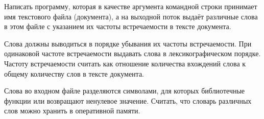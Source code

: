
Написать программу, которая в качестве аргумента командной строки
принимает имя текстового файла (документа), а на выходной поток выдаёт
различные слова в этом файле с указанием их частоты встречаемости в
тексте документа.

Слова должны выводиться в порядке убывания их
частоты встречаемости. При одинаковой частоте встречаемости выдавать
слова в лексикографическом порядке. Частоту встречаемости считать как
отношение количества вхождений слова к общему количеству слов в
тексте документа.

Слова во входном файле разделяются символами, для
которых библиотечные функции  или  возвращают
ненулевое значение. Считать, что словарь различных слов можно хранить в
оперативной памяти.
